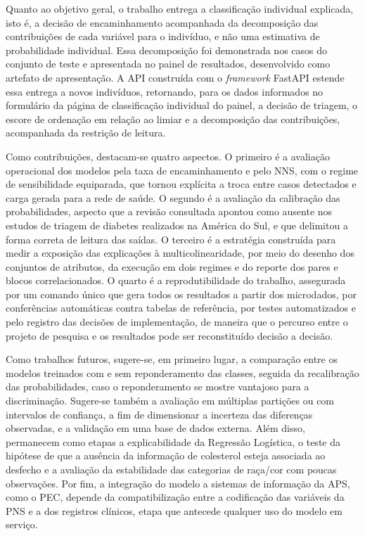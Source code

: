 Quanto ao objetivo geral, o trabalho entrega a classificação individual explicada, isto é, a decisão de encaminhamento acompanhada da decomposição das contribuições de cada variável para o indivíduo, e não uma estimativa de probabilidade individual. Essa decomposição foi demonstrada nos casos do conjunto de teste e apresentada no painel de resultados, desenvolvido como artefato de apresentação. A API construída com o \textit{framework} FastAPI estende essa entrega a novos indivíduos, retornando, para os dados informados no formulário da página de classificação individual do painel, a decisão de triagem, o escore de ordenação em relação ao limiar e a decomposição das contribuições, acompanhada da restrição de leitura.

Como contribuições, destacam-se quatro aspectos. O primeiro é a avaliação operacional dos modelos pela taxa de encaminhamento e pelo NNS, com o regime de sensibilidade equiparada, que tornou explícita a troca entre casos detectados e carga gerada para a rede de saúde. O segundo é a avaliação da calibração das probabilidades, aspecto que a revisão consultada apontou como ausente nos estudos de triagem de diabetes realizados na América do Sul, e que delimitou a forma correta de leitura das saídas. O terceiro é a estratégia construída para medir a exposição das explicações à multicolinearidade, por meio do desenho dos conjuntos de atributos, da execução em dois regimes e do reporte dos pares e blocos correlacionados. O quarto é a reprodutibilidade do trabalho, assegurada por um comando único que gera todos os resultados a partir dos microdados, por conferências automáticas contra tabelas de referência, por testes automatizados e pelo registro das decisões de implementação, de maneira que o percurso entre o projeto de pesquisa e os resultados pode ser reconstituído decisão a decisão.

Como trabalhos futuros, sugere-se, em primeiro lugar, a comparação entre os modelos treinados com e sem reponderamento das classes, seguida da recalibração das probabilidades, caso o reponderamento se mostre vantajoso para a discriminação. Sugere-se também a avaliação em múltiplas partições ou com intervalos de confiança, a fim de dimensionar a incerteza das diferenças observadas, e a validação em uma base de dados externa. Além disso, permanecem como etapas a explicabilidade da Regressão Logística, o teste da hipótese de que a ausência da informação de colesterol esteja associada ao desfecho e a avaliação da estabilidade das categorias de raça/cor com poucas observações. Por fim, a integração do modelo a sistemas de informação da APS, como o PEC, depende da compatibilização entre a codificação das variáveis da PNS e a dos registros clínicos, etapa que antecede qualquer uso do modelo em serviço.

